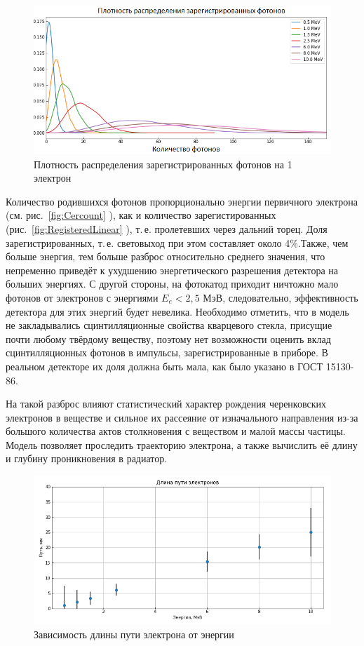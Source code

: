 \documentclass[12pt,a4paper]{report} %
\begin{document}
\begin{figure}
\begin{center}
	\includegraphics[width=.9\textwidth]{pictures/GEANT/light_density1.png}
	\caption{Плотность распределения зарегистрированных фотонов на 1 электрон}
	\label{fig:RegisteredDensity}
\end{center}
\end{figure}
Количество родившихся фотонов пропорционально энергии первичного электрона (см. рис.~\ref{fig:Cercount} \afterpage{\clearpage}), как и количество зарегистированных (рис.~\ref{fig:RegisteredLinear}\afterpage{\clearpage} ), т.\,е. пролетевших через дальний торец. Доля зарегистрированных, т.\,е. световыход при этом составляет около 4\%.Также, чем больше энергия, тем больше разброс относительно среднего значения, что непременно приведёт к ухудшению энергетического разрешения детектора на больших энергиях. С другой стороны, на фотокатод приходит ничтожно мало фотонов от электронов с энергиями $E_e<2,5$ МэВ, следовательно, эффективность детектора для этих энергий будет невелика. Необходимо отметить, что в модель не закладывались сцинтилляционные свойства кварцевого стекла, присущие почти любому твёрдому веществу, поэтому нет возможности оценить вклад сцинтилляционных фотонов в импульсы, зарегистрированные в приборе. В реальном детекторе их доля должна быть мала, как было указано в ГОСТ 15130-86.

На такой разброс влияют статистический характер рождения черенковских электронов в веществе и сильное их рассеяние от изначального направления из-за большого количества актов столкновения с веществом и малой массы частицы. Модель позволяет проследить траекторию электрона, а также вычислить её длину и глубину проникновения в радиатор.
\begin{figure}[th!]
\begin{center}
	\includegraphics[width=.9\textwidth]{pictures/GEANT/length_dependence.png}
	\caption{Зависимость длины пути электрона от энергии}
	\label{pic:length}
\end{center}
\end{figure}
\end{document}
